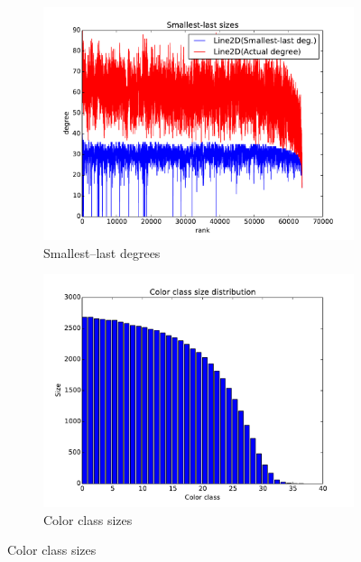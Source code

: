 \documentclass[oneside, titlepage]{scrartcl}
\begin{document}
\begin{figure}[!h]
\begin{subfigure}{0.5\textwidth}
	\centering
	\includegraphics[width=0.9\linewidth]{figures/ordering5.pdf}
	\caption{Smallest--last degrees}
\end{subfigure}%
\begin{subfigure}{0.5\textwidth}
	\centering
	\includegraphics[width=0.9\linewidth]{figures/colors5.pdf}
	\caption{Color class sizes}
\end{subfigure}


\end{figure}
\end{document}

